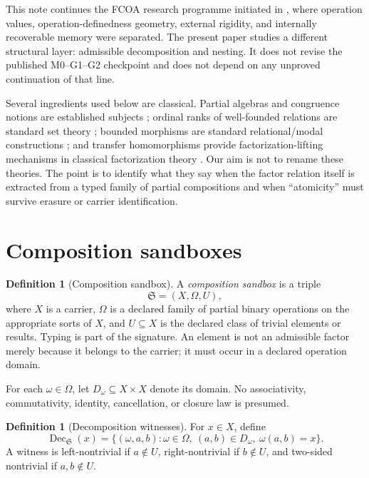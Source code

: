 \documentclass[11pt]{article}
\theoremstyle{definition}
\newtheorem{definition}[theorem]{Definition}
\theoremstyle{remark}
\newcommand{\Sbx}{\mathfrak S}
\newcommand{\Dec}{\operatorname{Dec}}
\begin{document}
This note continues the FCOA research programme initiated in \cite{MalachevskyFCOA2026}, where operation values, operation-definedness geometry, external rigidity, and internally recoverable memory were separated. The present paper studies a different structural layer: admissible decomposition and nesting. It does not revise the published M0--G1--G2 checkpoint and does not depend on any unproved continuation of that line.

Several ingredients used below are classical. Partial algebras and congruence notions are established subjects \cite{Gratzer1979,GratzerWenzel1967}; ordinal ranks of well-founded relations are standard set theory \cite{Jech2003}; bounded morphisms are standard relational/modal constructions \cite{BlackburnDeRijkeVenema2001}; and transfer homomorphisms provide factorization-lifting mechanisms in classical factorization theory \cite{GeroldingerHalterKoch2006}. Our aim is not to rename these theories. The point is to identify what they say when the factor relation itself is extracted from a typed family of partial compositions and when ``atomicity'' must survive erasure or carrier identification.

\section{Composition sandboxes}

\begin{definition}[Composition sandbox]
A \emph{composition sandbox} is a triple
\begin{equation}
\Sbx=(X,\Omega,U),
\label{eq:sandbox}
\end{equation}
where \(X\) is a carrier, \(\Omega\) is a declared family of partial binary operations on the appropriate sorts of \(X\), and \(U\subseteq X\) is the declared class of trivial elements or results. Typing is part of the signature. An element is not an admissible factor merely because it belongs to the carrier; it must occur in a declared operation domain.
\end{definition}

For each \(\omega\in\Omega\), let \(D_\omega\subseteq X\times X\) denote its domain. No associativity, commutativity, identity, cancellation, or closure law is presumed.

\begin{definition}[Decomposition witnesses]
For \(x\in X\), define
\begin{equation}
\Dec_{\Sbx}(x)=\{(\omega,a,b):\omega\in\Omega,\ (a,b)\in D_\omega,\ \omega(a,b)=x\}.
\label{eq:dec}
\end{equation}
A witness is left-nontrivial if \(a\notin U\), right-nontrivial if \(b\notin U\), and two-sided nontrivial if \(a,b\notin U\).
\end{definition}
\end{document}
